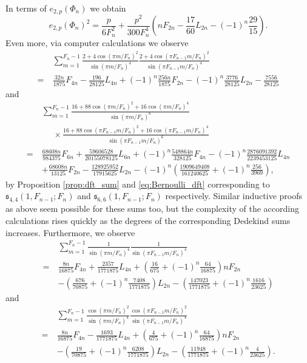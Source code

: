 \documentclass[]{interact}
\newcommand{\frs}{\mathfrak{s}}
\theoremstyle{definition}
\numberwithin{table}{section} %
\numberwithin{figure}{section}
\begin{document}
In terms of $e_{2, p}(\Phi_n)$ we obtain
$$
e_{2, p}(\Phi_n)^2 = \frac p{6F_n^2} + \frac{p^2}{300F_n^4} \left(nF_{2n} - \frac{17}{60} L_{2n} - (-1)^n \frac{29}{15}\right).
$$
Even more, via computer calculations we observe
\begin{align*}
    & \sum_{m=1}^{F_n-1} \frac{2+4\cos(\pi m/F_n)^2}{\sin(\pi m/F_n)^4} \frac{2+4\cos(\pi F_{n-1}m/F_n)^2}{\sin(\pi F_{n-1}m/F_n)^4} \\
    = ~& \frac{32n}{1875} F_{4n} - \frac{196}{28125} L_{4n} + (-1)^n \frac{256n}{1875} F_{2n} - (-1)^n \frac{3776}{28125} L_{2n} - \frac{7556}{28125}
\end{align*}
and
\begin{align*}
    & \sum_{m=1}^{F_n-1} \frac{16+88\cos(\pi m/F_n)^2+16\cos(\pi m/F_n)^4}{\sin(\pi m/F_n)^6} \\
    & ~~~~~~ \times \frac{16+88\cos(\pi F_{n-1}m/F_n)^2+16\cos(\pi F_{n-1}m/F_n)^4}{\sin(\pi F_{n-1}m/F_n)^6} \\
    = ~& \frac{68608n}{984375} F_{6n} + \frac{59606528}{20155078125} L_{6n} + (-1)^n \frac{548864n}{328125} F_{4n} - (-1)^n \frac{2876091392}{2239453125} L_{4n} \\
	& + \frac{68608n}{13125} F_{2n} - \frac{128925952}{17915625} L_{2n} - (-1)^n \left( \frac{1909649408}{161240625} + (-1)^n \frac{256}{3969} \right),
\end{align*}
by Proposition \ref{prop:dft_sum} and \eqref{eq:Bernoulli_dft} corresponding to $\frs^{}_{4,4}(1, F_{n-1}; F_n)$ and $\frs^{}_{6, 6}(1, F_{n-1}; F_n)$ respectively. Similar inductive proofs as above seem possible for these sums too, but the complexity of the according calculations rises quickly as the degrees of the corresponding Dedekind sums increases. Furthermore, we observe
\begin{align*}
	& \sum_{m=1}^{F_n-1} \frac1{\sin(\pi m/{F_n})^4} \frac1{\sin(\pi F_{n-1} m/{F_n})^4} \\
	= ~ & \frac{8n}{16875} F_{4n} + \frac{2357}{1771875} L_{4n} + \left(\frac{16}{675} + (-1)^n \frac{64}{16875}\right) n F_{2n} \\
	& - \left(\frac{676}{70875} + (-1)^n \frac{7408}{1771875} \right) L_{2n} - \left(\frac{147023}{1771875} + (-1)^n \frac{1616}{23625} \right)
\end{align*}
and
\begin{align*}
	& \sum_{m=1}^{F_n-1} \frac{\cos(\pi m/{F_n})^2}{\sin(\pi m/{F_n})^4} \frac{{\cos(\pi F_{n-1} m/{F_n})^2}}{\sin(\pi F_{n-1} m/{F_n})^4} \\
	= ~ & \frac{8n}{16875} F_{4n} - \frac{1693}{1771875} L_{4n} + \left(\frac{4}{675} + (-1)^n \frac{64}{16875}\right) n F_{2n} \\
	& - \left(\frac{19}{70875} + (-1)^n \frac{6208}{1771875} \right) L_{2n} - \left(\frac{11948}{1771875} + (-1)^n \frac{4}{23625} \right).
\end{align*}
\end{document}

